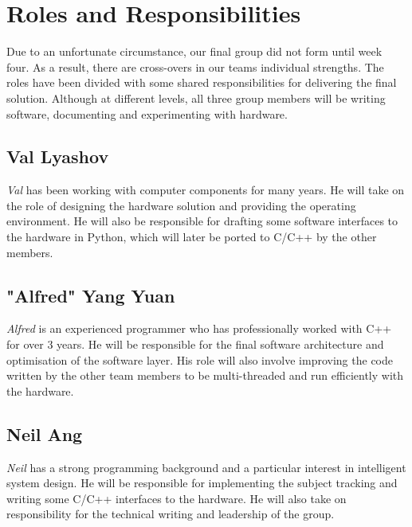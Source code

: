 \documentclass[11pt,a4paper,titlepage]{report}
\begin{document}
\section{Roles and Responsibilities}



Due to an unfortunate circumstance, our final group did not form until week four. As a result, there are cross-overs in our teams individual strengths. The roles have been divided with some shared responsibilities for delivering the final solution. Although at different levels, all three group members will be writing software, documenting and experimenting with hardware.


\subsection{Val Lyashov}
\textit{Val} has been working with computer components for many years. He will take on the role of designing the hardware solution and providing the operating environment. He will also be responsible for drafting some software interfaces to the hardware in Python, which will later be ported to C/C++ by the other members.


\subsection{"Alfred" Yang Yuan}
\textit{Alfred} is an experienced programmer who has professionally worked with C++ for over 3 years. He will be responsible for the final software architecture and optimisation of the software layer. His role will also involve improving the code written by the other team members to be multi-threaded and run efficiently with the hardware.

\subsection{Neil Ang}
\textit{Neil} has a strong programming background and a particular interest in intelligent system design. He will be responsible for implementing the subject tracking and writing some C/C++ interfaces to the hardware. He will also take on responsibility for the technical writing and leadership of the group. 
\end{document}
